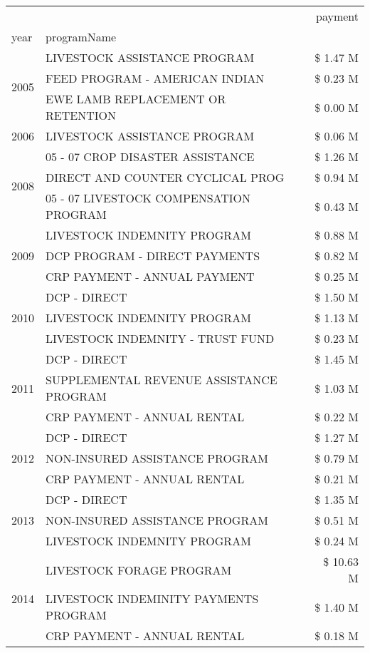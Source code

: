 \begin{tabular}{llr}
\toprule
 &  & payment \\
year & programName &  \\
\midrule
\multirow[t]{3}{*}{2005} & LIVESTOCK ASSISTANCE PROGRAM & \$ 1.47 M \\
 & FEED PROGRAM - AMERICAN INDIAN & \$ 0.23 M \\
 & EWE LAMB REPLACEMENT OR RETENTION & \$ 0.00 M \\
\cline{1-3}
2006 & LIVESTOCK ASSISTANCE PROGRAM & \$ 0.06 M \\
\cline{1-3}
\multirow[t]{3}{*}{2008} & 05 - 07 CROP DISASTER ASSISTANCE & \$ 1.26 M \\
 & DIRECT AND COUNTER CYCLICAL PROG & \$ 0.94 M \\
 & 05 - 07 LIVESTOCK COMPENSATION PROGRAM & \$ 0.43 M \\
\cline{1-3}
\multirow[t]{3}{*}{2009} & LIVESTOCK INDEMNITY PROGRAM & \$ 0.88 M \\
 & DCP PROGRAM - DIRECT PAYMENTS & \$ 0.82 M \\
 & CRP PAYMENT - ANNUAL PAYMENT & \$ 0.25 M \\
\cline{1-3}
\multirow[t]{3}{*}{2010} & DCP - DIRECT & \$ 1.50 M \\
 & LIVESTOCK INDEMNITY PROGRAM & \$ 1.13 M \\
 & LIVESTOCK INDEMNITY - TRUST FUND & \$ 0.23 M \\
\cline{1-3}
\multirow[t]{3}{*}{2011} & DCP - DIRECT & \$ 1.45 M \\
 & SUPPLEMENTAL REVENUE ASSISTANCE PROGRAM & \$ 1.03 M \\
 & CRP PAYMENT - ANNUAL RENTAL & \$ 0.22 M \\
\cline{1-3}
\multirow[t]{3}{*}{2012} & DCP - DIRECT & \$ 1.27 M \\
 & NON-INSURED ASSISTANCE PROGRAM & \$ 0.79 M \\
 & CRP PAYMENT - ANNUAL RENTAL & \$ 0.21 M \\
\cline{1-3}
\multirow[t]{3}{*}{2013} & DCP - DIRECT & \$ 1.35 M \\
 & NON-INSURED ASSISTANCE PROGRAM & \$ 0.51 M \\
 & LIVESTOCK INDEMNITY PROGRAM & \$ 0.24 M \\
\cline{1-3}
\multirow[t]{3}{*}{2014} & LIVESTOCK FORAGE PROGRAM & \$ 10.63 M \\
 & LIVESTOCK INDEMINITY PAYMENTS PROGRAM & \$ 1.40 M \\
 & CRP PAYMENT - ANNUAL RENTAL & \$ 0.18 M \\

\end{tabular}
